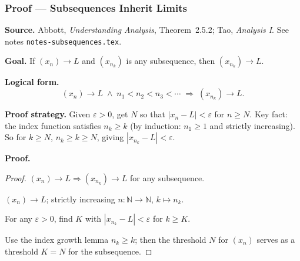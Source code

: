 
\clearpage
{}
\hypertarget{proof-RA-TAO-P-subseq-inherits}{}

\subsubsection[Subsequences Inherit Limits]{Proof --- Subsequences Inherit Limits}

\bigskip

\noindent
\textbf{Source.}
Abbott, \emph{Understanding Analysis}, Theorem~2.5.2; Tao, \emph{Analysis I}.
See notes \texttt{notes-subsequences.tex}.

\vspace{0.75em}

\noindent
\textbf{Goal.}
If $(x_n) \to L$ and $(x_{n_k})$ is any subsequence, then
$(x_{n_k}) \to L$.

\vspace{0.75em}

\noindent
\textbf{Logical form.}
\[
  (x_n) \to L
  \;\wedge\;
  n_1 < n_2 < n_3 < \cdots
  \;\Rightarrow\;
  (x_{n_k}) \to L.
\]

\vspace{0.75em}

\noindent
\textbf{Proof strategy.}
Given $\varepsilon > 0$, get $N$ so that $|x_n - L| < \varepsilon$ for $n \ge N$.
Key fact: the index function satisfies $n_k \ge k$ (by induction: $n_1 \ge 1$
and strictly increasing). So for $k \ge N$, $n_k \ge k \ge N$, giving
$|x_{n_k} - L| < \varepsilon$.

\vspace{0.75em}

\noindent
\textbf{Proof.}
\begin{proof}
\Claim $(x_n) \to L \Rightarrow (x_{n_k}) \to L$ for any subsequence.

\Given $(x_n) \to L$; strictly increasing $n : \mathbb{N} \to \mathbb{N}$,
$k \mapsto n_k$.

\Goal For any $\varepsilon > 0$, find $K$ with $|x_{n_k} - L| < \varepsilon$ for
$k \ge K$.

\Strategy Use the index growth lemma $n_k \ge k$; then the threshold $N$
for $(x_n)$ serves as a threshold $K = N$ for the subsequence.

\medskip




\end{proof}

